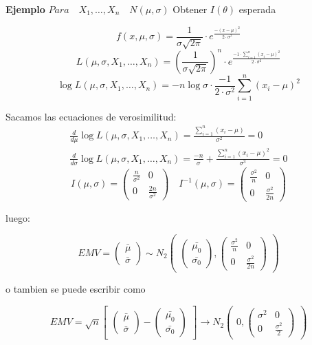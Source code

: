 \textbf{Ejemplo}
\(
Para \quad X_1,\dots,X_n \quad N(\mu,\sigma) 
\)
Obtener $I(\theta)$ esperada

\[
f(x,\mu,\sigma)=\frac{1}{\sigma \sqrt{2 \pi}} \cdot e^{\frac{-(x-\mu)^2}{2 \cdot \sigma^2}}
\]\[ L(\mu,\sigma,X_1,\dots,X_n)= \left(\frac{1}{\sigma \sqrt{2 \pi}}\right)^n \cdot e^{\frac{-1 \cdot \sum_{i=1}^{n}(x_i-\mu)^2}{2 \cdot \sigma^2}}
\]\[ \log L(\mu,\sigma,X_1,\dots,X_n)= -n \log \sigma \cdot \frac{-1}{2 \cdot \sigma^2} \sum_{i=1}^{n}(x_i-\mu)^2
\]

Sacamos las ecuaciones de verosimilitud:
\[
\begin{matrix}
    \frac{d}{d \mu} \log L(\mu,\sigma,X_1,\dots,X_n)=\frac{\sum_{i=1}^{n} (x_i-\mu)}{\sigma^2}=0 \\
    \frac{d}{d \sigma} \log L(\mu,\sigma,X_1,\dots,X_n)=\frac{-n}{\sigma}+ \frac{\sum_{i=1}^{n}(x_i-\mu)^2}{\sigma^3}=0
\end{matrix}
\]
\[
I(\mu,\sigma)=
\begin{pmatrix}
    \frac{n}{\sigma^2} & 0\\
    0 & \frac{2n}{\sigma^2}
\end{pmatrix}
\quad I^{-1}(\mu,\sigma)=
\begin{pmatrix}
    \frac{\sigma^2}{n} & 0\\
    0 & \frac{\sigma^2}{2n}
\end{pmatrix}
\]

luego:

\[
EMV=
\begin{pmatrix}
    \bar{\mu}\\
    \bar{\sigma}
\end{pmatrix}
\sim N_2
\begin{pmatrix}

\begin{pmatrix}
    \bar{\mu_0}\\
    \bar{\sigma_0}
\end{pmatrix}
,
\begin{pmatrix}
    \frac{\sigma^2}{n} & 0\\
    0 & \frac{\sigma^2}{2n}
\end{pmatrix}
    
\end{pmatrix}
\]

o tambien se puede escribir como

\[ EMV=\sqrt{n}
\begin{bmatrix}
    \begin{pmatrix}
        \bar{\mu}\\
        \bar{\sigma}
    \end{pmatrix}
    -
    \begin{pmatrix}
        \bar{\mu_0}\\
        \bar{\sigma_0}
    \end{pmatrix}
\end{bmatrix}
\to
N_2
\begin{pmatrix}
    0,
    \begin{pmatrix}
        \sigma^2 & 0\\
        0 & \frac{\sigma^2}{2}
    \end{pmatrix}
        
    \end{pmatrix}
\]

